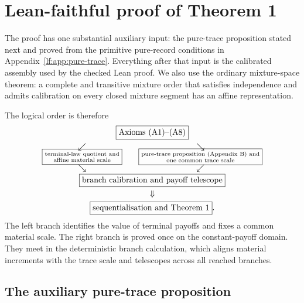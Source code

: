 
\section{Lean-faithful proof of Theorem 1}\label{app:lean-faithful-main}

The proof has one substantial auxiliary input: the pure-trace proposition
stated next and proved from the primitive pure-record conditions in
Appendix~\ref{lf:app:pure-trace}.  Everything after that input is the calibrated
assembly used by the checked Lean proof.  We also use the ordinary
mixture-space theorem: a complete and transitive mixture order that satisfies
independence and admits calibration on every closed mixture segment has an
affine representation.

The logical order is therefore
\[
\begin{gathered}
\boxed{\text{Axioms \textup{(A1)--(A8)}}}\\[-0.1em]
\begin{array}{ccc}
\swarrow && \searrow\\[-0.4em]
\boxed{\substack{\text{terminal-law quotient and}\\
                  \text{affine material scale}}}
&&
\boxed{\substack{\text{pure-trace proposition (Appendix B) and}\\
                  \text{one common trace scale}}}\\[-0.2em]
\searrow && \swarrow
\end{array}\\[-0.3em]
\boxed{\text{branch calibration and payoff telescope}}\\[-0.1em]
\Downarrow\\[-0.1em]
\boxed{\text{sequentialisation and Theorem 1}}.
\end{gathered}
\]
The left branch identifies the value of terminal payoffs and fixes a common
material scale.  The right branch is proved once on the constant-payoff
domain.  They meet in the deterministic branch calculation, which aligns
material increments with the trace scale and telescopes across all reached
branches.

\subsection{The auxiliary pure-trace proposition}

